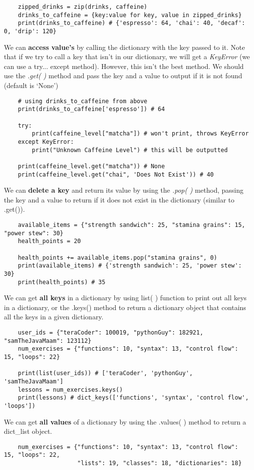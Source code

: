 \documentclass[11pt, a4paper]{article}
\begin{document}
\begin{spacing}{1.1}
\begin{lstlisting}
	zipped_drinks = zip(drinks, caffeine)
	drinks_to_caffeine = {key:value for key, value in zipped_drinks}
	print(drinks_to_caffeine) # {'espresso': 64, 'chai': 40, 'decaf': 0, 'drip': 120} \end{lstlisting}\vspace*{1mm}
	We can \textbf{access value's} by calling the dictionary with the key passed to it. Note that if we try to call a key that isn't in our dictionary, we will get a \textit{KeyError} (we can use a try... except method). However, this isn't the best method. We should use the \textit{.get( )} method and pass the key and a value to output if it is not found (default is `None')
	\begin{lstlisting}
	# using drinks_to_caffeine from above
	print(drinks_to_caffeine['espresso']) # 64 
	
	try:
		print(caffeine_level["matcha"]) # won't print, throws KeyError 
	except KeyError:
		print("Unknown Caffeine Level") # this will be outputted 
		
	print(caffeine_level.get("matcha")) # None
	print(caffeine_level.get("chai", 'Does Not Exist')) # 40 \end{lstlisting}\vspace*{1mm}
	We can \textbf{delete a key} and return its value by using the \textit{.pop( )} method, passing the key and a value to return if it does not exist in the dictionary (similar to .get()).
	\begin{lstlisting}
	available_items = {"strength sandwich": 25, "stamina grains": 15, "power stew": 30}
	health_points = 20
	
	health_points += available_items.pop("stamina grains", 0)
	print(available_items) # {'strength sandwich': 25, 'power stew': 30}
	print(health_points) # 35 \end{lstlisting}\vspace*{1mm}
	We can get \textbf{all keys} in a dictionary by using list( ) function to print out all keys in a dictionary, or the .keys() method to return a dictionary object that contains all the keys in a given dictionary.
	\begin{lstlisting}
	user_ids = {"teraCoder": 100019, "pythonGuy": 182921, "samTheJavaMaam": 123112}
	num_exercises = {"functions": 10, "syntax": 13, "control flow": 15, "loops": 22}
	
	print(list(user_ids)) # ['teraCoder', 'pythonGuy', 'samTheJavaMaam']
	lessons = num_exercises.keys()
	print(lessons) # dict_keys(['functions', 'syntax', 'control flow', 'loops']) \end{lstlisting} \newpage
	\noindent We can get \textbf{all values} of a dictionary by using the .values( ) method to return a dict\_list object. 
	\begin{lstlisting}
	num_exercises = {"functions": 10, "syntax": 13, "control flow": 15, "loops": 22, 
	                 "lists": 19, "classes": 18, "dictionaries": 18}
	

\end{lstlisting}
\end{spacing}
\end{document}
